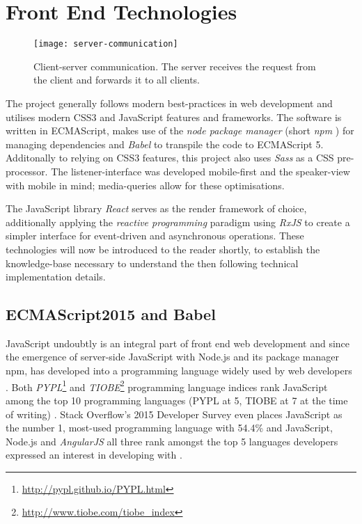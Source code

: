 \section{Front End Technologies}
\label{sec:implementation-technologies}

\begin{figure}
\centering
\texttt{[image: server-communication]}
\caption{Client-server communication. The server receives the request from the client and forwards it to all clients.}
\label{fig:implementation-client-server-communication}
\end{figure}

The project generally follows modern best-practices in web development and utilises modern CSS3 and JavaScript features and frameworks. The software is written in ECMA\-Script, makes use of the \emph{node package manager} (short \emph{npm} \cite{npm}) for managing dependencies and \emph{Babel} \cite{babel} to transpile the code to ECMA\-Script 5. Additonally to relying on CSS3 features, this project also uses \emph{Sass} \cite{sass} as a CSS pre-processor. The listener-interface was developed mobile-first and the speaker-view with mobile in mind; media-queries allow for these optimisations.

The JavaScript library \emph{React} \cite{react} serves as the render framework of choice, additionally applying the \emph{reactive programming} paradigm using \emph{RxJS} \cite{rxjs} to create a simpler interface for event-driven and asynchronous operations. These technologies will now be introduced to the reader shortly, to establish the knowledge-base necessary to understand the then following technical implementation details.

\subsection{ECMAScript2015 and Babel}
\label{sec:implementation-technologies-es6}
JavaScript undoubtly is an integral part of front end web development and since the emergence of server-side JavaScript with Node.js and its package manager npm, has developed into a programming language widely used by web developers \cite{gpm-meta-transcompiler}. Both \emph{PYPL}\footnote{\url{http://pypl.github.io/PYPL.html}} and \emph{TIOBE}\footnote{\url{http://www.tiobe.com/tiobe_index}} programming language indices rank JavaScript among the top 10 programming languages (PYPL at 5, TIOBE at 7 at the time of writing) \cite{gpm-meta-transcompiler}. Stack Overflow's 2015 Developer Survey even places JavaScript as the number 1, most-used programming language with 54.4\% and JavaScript, Node.js and \emph{AngularJS} \cite{angularjs} all three rank amongst the top 5 languages developers expressed an interest in developing with \cite{stackoverflow-developer-survey}.

